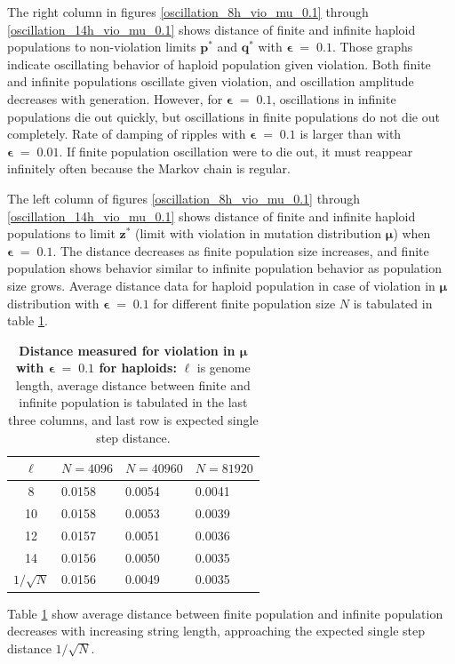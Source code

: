 The right column in figures \ref{oscillation_8h_vio_mu_0.1} through \ref{oscillation_14h_vio_mu_0.1} 
shows distance of finite and infinite haploid populations to non-violation limits $\bm{p^\ast}$ and $\bm{q^\ast}$ with $\bm{\epsilon} \;=\; 0.1$. 
Those graphs indicate oscillating behavior of haploid population given violation. 
Both finite and infinite populations oscillate given violation, and oscillation amplitude decreases with generation. 
However, for $\bm{\epsilon} \;=\; 0.1$, oscillations in infinite populations die out quickly, 
but oscillations in finite populations do not die out completely. Rate of damping of ripples with $\bm{\epsilon} \;=\; 0.1$ is  
larger than with $\bm{\epsilon} \;=\; 0.01$. If finite population oscillation were to die out, 
it must reappear infinitely often because the Markov chain is regular.

The left column of figures \ref{oscillation_8h_vio_mu_0.1} through \ref{oscillation_14h_vio_mu_0.1} 
shows distance of finite and infinite haploid populations to limit $\bm{z^\ast}$ 
(limit with violation in mutation distribution $\bm{\mu}$) when $\bm{\epsilon} \;=\; 0.1$. 
The distance decreases as finite population size increases, 
and finite population shows behavior similar to infinite population behavior as population size grows. 
Average distance data for haploid population in case of violation in $\bm{\mu}$ distribution 
with $\bm{\epsilon} \;=\; 0.1$ for different finite population size $N$ is tabulated in table \ref{distanceMuHapEps0.1}.

\clearpage
\begin{table}[ht]
\caption[\textbf{Distance measured for violation in $\bm{\mu}$ with $\bm{\epsilon} \;=\; 0.1$ for haploids}]{\textbf{Distance measured for violation in $\bm{\mu}$ with $\bm{\epsilon} \;=\; 0.1$ for haploids:} $\ell$ is genome length, 
average distance between finite and infinite population is tabulated in the last three columns, and last row is expected single step distance.}
\centering
\begin{tabularx}{0.75\textwidth}{ c *{3}{X}}
\toprule
$\ell$ & $N = 4096$ & $N = 40960$ & $N = 81920$ \\
\midrule
8 & 0.0158	& 0.0054 	& 0.0041 \\
10 & 0.0158	& 0.0053 	& 0.0039 \\	
12 & 0.0157	& 0.0051 	& 0.0036 \\	
14 & 0.0156	& 0.0050 	& 0.0035 \\
\midrule
$1/\sqrt{N}$ & 0.0156 & 0.0049 & 0.0035 \\
\bottomrule
\end{tabularx}
\label{distanceMuHapEps0.1}
\end{table}

Table \ref{distanceMuHapEps0.1} show average distance 
between finite population and infinite population decreases with increasing string length, 
approaching the expected single step distance $1/\sqrt{N}$. 
